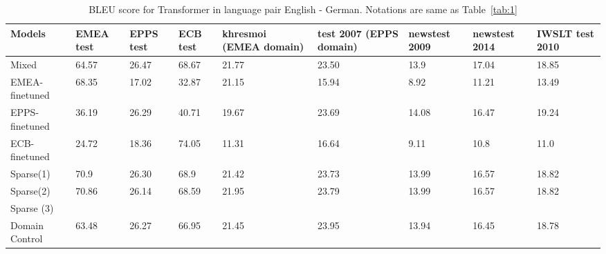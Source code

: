 \documentclass[11pt,a4paper]{article}
\begin{document}
\begin{table}
\begin{center}
 \begin{tabularx}{\textwidth}{|| X | X | X | X | X | X | X | X | X ||} 
 \hline
 Models & EMEA test & EPPS test & ECB test & khresmoi (EMEA domain) & test 2007 (EPPS domain) & newstest 2009 & newstest 2014 & IWSLT test 2010 \\ [0.5ex] 
 \hline\hline
 Mixed & 64.57 & 26.47 & 68.67 & 21.77 & 23.50 & 13.9 & 17.04 & 18.85 \\
 \hline
 EMEA-finetuned & 68.35 & 17.02 & 32.87 & 21.15 & 15.94 & 8.92 & 11.21 & 13.49 \\
 \hline
 EPPS-finetuned & 36.19 & 26.29 & 40.71 & 19.67 & 23.69 & 14.08 & 16.47 & 19.24 \\
 \hline
 ECB-finetuned & 24.72 & 18.36 & 74.05 & 11.31 & 16.64 & 9.11 & 10.8 & 11.0 \\
 \hline
 Sparse(1) & 70.9 & 26.30 & 68.9 & 21.42 & 23.73 & 13.99 & 16.57 & 18.82 \\
 \hline
 Sparse(2) & 70.86 & 26.14 & 68.59 & 21.95 & 23.79 & 13.99 & 16.57 & 18.82 \\
 \hline
 Sparse (3) &  &  &  &  &  &  &  & \\
 \hline
 Domain Control & 63.48 & 26.27 & 66.95 & 21.45 & 23.95 & 13.94 & 16.45 & 18.78  \\
 \hline
\end{tabularx}
\end{center}
\caption{BLEU score for Transformer in language pair English - German. Notations are same as Table~\ref{tab:1}}
\label{tab:2}
\end{table}
\end{document}
